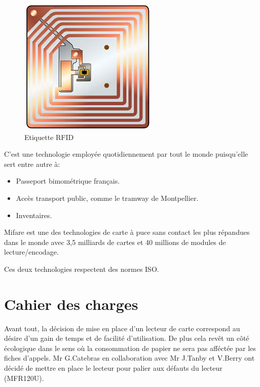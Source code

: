     \begin{figure}[h]
        \begin{center}
            \includegraphics[scale=0.6]{RFIDtag.jpg} 
        \end{center}

        \caption{Etiquette RFID}
        \label{Etiquette RFID}
    \end{figure}


C'est une technologie employée quotidiennement par tout le monde puisqu'elle
sert entre autre à:

\begin{itemize}
\item Passeport bimométrique français.
\item Accès transport public, comme le tramway de Montpellier.
\item Inventaires.
\end{itemize}

Mifare est une des technologies de carte à puce sans contact les plus répandues
dans le monde avec 3,5 milliards de cartes et 40 millions de modules de lecture/encodage.

Ces deux technologies respectent des normes ISO.



\section{Cahier des charges}
Avant tout, la décision de mise en place d'un lecteur de carte correspond au désire 
d'un gain de temps et de facilité d'utilisation. De plus cela revêt un côté écologique 
dans le sens où la consommation de papier ne sera pas afféctée par les fiches d'appels.
Mr G.Catebras en collaboration avec Mr J.Tanby et V.Berry ont décidé de mettre en place 
le lecteur pour palier aux défauts du lecteur (MFR120U).

